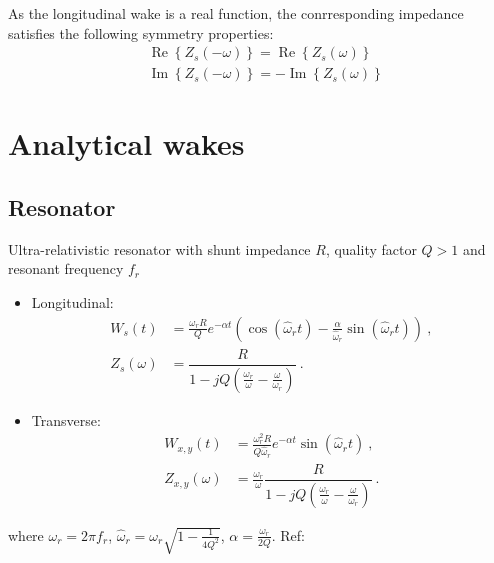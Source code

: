 As the longitudinal wake is a real function, the conrresponding impedance satisfies the following symmetry properties:
\begin{align}
&\operatorname{Re}\left\{ Z_{s}( - \omega) \right\}
=
\operatorname{Re}\left\{ Z_s( \omega) \right\}\\
&\operatorname{Im}\left\{ Z_{s}( -\omega) \right\}
=
-\operatorname{Im}\left\{ Z_{s}( \omega) \right\}
\end{align}

\section{Analytical wakes}
\subsection*{Resonator}
Ultra-relativistic resonator with shunt impedance $R$, quality factor $Q>1$ and resonant frequency $f_r$
\begin{itemize}
    \item Longitudinal:
    \begin{align}
        W_{s}(t) &= \frac{\omega_r R}{Q} e^{-\alpha t} \left(
                   \cos(\widehat{\omega}_r t) -
                   \frac{\alpha}{\widehat{\omega}_r} \sin(\widehat{\omega}_r t)\right)~,\\
        Z_{s}(\omega) &= \dfrac{R}{1 - jQ\left(\frac{\omega_r}{\omega} - \frac{\omega}{\omega_r}\right)}~.
    \end{align}
    \item Transverse:
    \begin{align}
        W_{x,y}(t) &= \frac{\omega_r^2 R }{Q \widehat{\omega}_r} e^{-\alpha t}\sin(\widehat{\omega}_r t)~,\\
        Z_{x,y}(\omega) &= \frac{\omega_r}{\omega} \dfrac{R}{1 - jQ\left(\frac{\omega_r}{\omega} - \frac{\omega}{\omega_r}\right)}~.
    \end{align}
\end{itemize}
where $\omega_r = 2\pi f_r$, $\widehat{\omega}_r = \omega_r \sqrt{1-\frac{1}{4Q^2}}$, $\alpha=\frac{\omega_r}{2Q}$. Ref: \cite[Section 2.2]{Mounet:Thesis}

